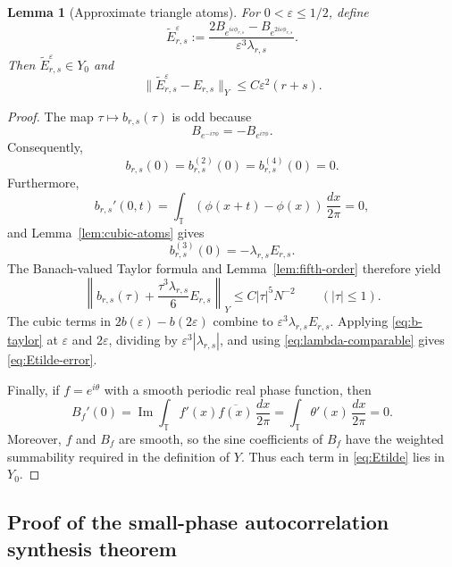 \documentclass[11pt]{amsart}
\newtheorem{lemma}[theorem]{Lemma}
\theoremstyle{definition}
\theoremstyle{remark}
\newcommand{\T}{\mathbb T}
\begin{document}
\begin{lemma}[Approximate triangle atoms]\label{lem:approx-atoms}
For $0<\varepsilon\leq1/2$, define
\begin{equation}\label{eq:Etilde}
 \widetilde E_{r,s}^{\varepsilon}
 :=\frac{2B_{e^{i\varepsilon\phi_{r,s}}}
 -B_{e^{2i\varepsilon\phi_{r,s}}}}
 {\varepsilon^3\lambda_{r,s}}.
\end{equation}
Then $\widetilde E_{r,s}^{\varepsilon}\in Y_0$ and
\begin{equation}\label{eq:Etilde-error}
 \|\widetilde E_{r,s}^{\varepsilon}-E_{r,s}\|_Y
 \leq C\varepsilon^2(r+s).
\end{equation}
\end{lemma}

\begin{proof}
The map $\tau\mapsto b_{r,s}(\tau)$ is odd because
\[
 B_{e^{-i\tau\phi}}=-B_{e^{i\tau\phi}}.
\]
Consequently,
\[
 b_{r,s}(0)=b_{r,s}^{(2)}(0)=b_{r,s}^{(4)}(0)=0.
\]
Furthermore,
\[
 b_{r,s}'(0,t)
 =\int_\T(\phi(x+t)-\phi(x))\,\frac{dx}{2\pi}=0,
\]
and Lemma~\ref{lem:cubic-atoms} gives
\[
 b_{r,s}^{(3)}(0)=-\lambda_{r,s}E_{r,s}.
\]
The Banach-valued Taylor formula and Lemma~\ref{lem:fifth-order} therefore yield
\begin{equation}\label{eq:b-taylor}
 \left\|b_{r,s}(\tau)
 +\frac{\tau^3\lambda_{r,s}}6E_{r,s}\right\|_Y
 \leq C|\tau|^5N^{-2}
 \qquad(|\tau|\leq1).
\end{equation}
The cubic terms in $2b(\varepsilon)-b(2\varepsilon)$ combine to $\varepsilon^3\lambda_{r,s}E_{r,s}$.  Applying \eqref{eq:b-taylor} at $\varepsilon$ and $2\varepsilon$, dividing by $\varepsilon^3|\lambda_{r,s}|$, and using \eqref{eq:lambda-comparable} gives \eqref{eq:Etilde-error}.

Finally, if $f=e^{i\theta}$ with a smooth periodic real phase function, then
\[
 B_f'(0)=\operatorname{Im}\int_\T f'(x)\overline{f(x)}\,\frac{dx}{2\pi}
 =\int_\T\theta'(x)\,\frac{dx}{2\pi}=0.
\]
Moreover, $f$ and $B_f$ are smooth, so the sine coefficients of $B_f$ have
the weighted summability required in the definition of $Y$. Thus each term
in \eqref{eq:Etilde} lies in $Y_0$.
\end{proof}


\subsection{Proof of the small-phase autocorrelation synthesis theorem}
\end{document}
